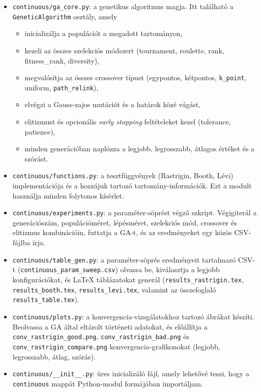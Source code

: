 \documentclass[a4paper,12pt]{article}
\begin{document}
\begin{itemize}
  \item \texttt{continuous/ga\_core.py}: a genetikus algoritmus magja.
        Itt található a \texttt{GeneticAlgorithm} osztály, amely
        \begin{itemize}
          \item inicializálja a populációt a megadott tartományon,
          \item kezeli az összes szelekciós módszert
                (tournament, roulette, rank, fitness\_rank, diversity),
          \item megvalósítja az összes crossover típust
                (egypontos, kétpontos, \texttt{k\_point}, uniform, \texttt{path\_relink}),
          \item elvégzi a Gauss-zajos mutációt és a határok közé vágást,
          \item elitizmust és opcionális \emph{early stopping} feltételeket kezel
                (tolerance, patience),
          \item minden generációban naplózza a legjobb, legrosszabb, átlagos
                értéket és a szórást.
        \end{itemize}
  \item \texttt{continuous/functions.py}: a tesztfüggvények (Rastrigin, Booth,
        Lévi) implementációja és a hozzájuk tartozó tartomány-információk.
        Ezt a modult használja minden folytonos kísérlet.
  \item \texttt{continuous/experiments.py}: a paraméter-söprést végző szkript.
        Végigiterál a generációszám, populációméret, lépésméret, szelekciós mód,
        crossover és elitizmus kombinációin, futtatja a GA-t, és az eredményeket
        egy közös CSV-fájlba írja.
  \item \texttt{continuous/table\_gen.py}: a paraméter-söprés eredményeit tartalmazó
        CSV-t (\texttt{continuous\_param\_sweep.csv}) olvassa be, kiválasztja a
        legjobb konfigurációkat, és LaTeX táblázatokat generál
        (\texttt{results\_rastrigin.tex}, \texttt{results\_booth.tex},
        \texttt{results\_levi.tex}, valamint az összefoglaló
        \texttt{results\_table.tex}).
  \item \texttt{continuous/plots.py}: a konvergencia-vizsgálatokhoz tartozó
        ábrákat készíti. Beolvassa a GA által eltárolt történeti adatokat,
        és előállítja a \texttt{conv\_rastrigin\_good.png},
        \texttt{conv\_rastrigin\_bad.png} és
        \texttt{conv\_rastrigin\_compare.png} konvergencia-grafikonokat
        (legjobb, legrosszabb, átlag, szórás).
  \item \texttt{continuous/\_\_init\_\_.py}: üres inicializáló fájl, amely
        lehetővé teszi, hogy a \texttt{continuous} mappát Python-modul
        formájában importáljam.
\end{itemize}
\end{document}
